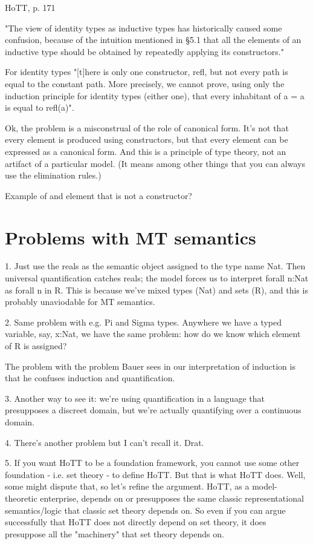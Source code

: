 \documentclass{article}
\begin{document}
HoTT, p. 171

"The view of identity types as inductive types has historically caused
some confusion, because of the intuition mentioned in §5.1 that all
the elements of an inductive type should be obtained by repeatedly
applying its constructors."

For identity types "[t]here is only one constructor, refl, but not
every path is equal to the constant path.  More precisely, we cannot
prove, using only the induction principle for identity types (either
one), that every inhabitant of a = a is equal to refl(a)".

Ok, the problem is a misconstrual of the role of canonical form.  It's
not that every element is produced using constructors, but that every
element can be expressed as a canonical form.  And this is a principle
of type theory, not an artifact of a particular model.  (It means
among other things that you can always use the elimination rules.)

Example of and element that is not a constructor?

\section{Problems with MT semantics}

1.  Just use the reals as the semantic object assigned to the type
name Nat.  Then universal quantification catches reals; the model
forces us to interpret forall n:Nat as forall n in R.  This is because
we've mixed types (Nat) and sets (R), and this is probably unaviodable
for MT semantics.

2.  Same problem with e.g. Pi and Sigma types.  Anywhere we have a
typed variable, say, x:Nat, we have the same problem: how do we know
which element of R is assigned?

The problem with the problem Bauer sees in our interpretation of
induction is that he confuses induction and quantification.

3.  Another way to see it: we're using quantification in a language
that presupposes a discreet domain, but we're actually quantifying
over a continuous domain.

4.  There's another problem but I can't recall it.  Drat.

5.  If you want HoTT to be a foundation framework, you cannot use some
other foundation - i.e. set theory - to define HoTT.  But that is what
HoTT does.  Well, some might dispute that, so let's refine the
argument.  HoTT, as a model-theoretic enterprise, depends on or
presupposes the same classic representational semantics/logic that
classic set theory depends on.  So even if you can argue successfully
that HoTT does not directly depend on set theory, it does presuppose
all the "machinery" that set theory depends on.
\end{document}
